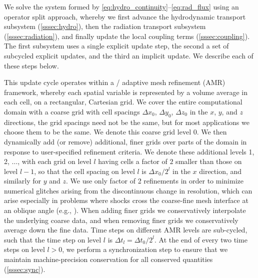 \documentclass[fleqn,usenatbib]{mnras}
\begin{document}
We solve the system formed by \autoref{eq:hydro_continuity}--\autoref{eq:rad_flux} using an operator split approach, whereby we first advance the hydrodynamic transport subsystem (\autoref{sssec:hydro}), then the radiation transport subsystem (\autoref{sssec:radiation}), and finally update the local coupling terms (\autoref{sssec:coupling}). The first subsystem uses a single explicit update step, the second a set of subcycled explicit updates, and the third an implicit update. We describe each of these steps below.

This update cycle operates within a \citet{Berger:1984} / \citet{Berger:1989} adaptive mesh refinement (AMR) framework, whereby each spatial variable is represented by a volume average in each cell, on a rectangular, Cartesian grid. We cover the entire computational domain with a coarse grid with cell spacings $\Delta x_0$, $\Delta y_0$, $\Delta z_0$ in the $x$, $y$, and $z$ directions, the grid spacings need not be the same, but for most applications we choose them to be the same. We denote this coarse grid level 0. We then dynamically add (or remove) additional, finer grids over parts of the domain in response to user-specified refinement criteria. We denote these additional levels 1, 2, $\ldots$, with each grid on level $l$ having cells a factor of $2$ smaller than those on level $l-1$, so that the cell spacing on level $l$ is $\Delta x_0/2^l$ in the $x$ direction, and similarly for $y$ and $z$. We use only factor of 2 refinements in order to minimize numerical glitches arising from the discontinuous change in resolution, which can arise especially in problems where shocks cross the coarse-fine mesh interface at an oblique angle (e.g., \citealt{Fryxell_2000}). When adding finer grids we conservatively interpolate the underlying coarse data, and when removing finer grids we conservatively average down the fine data. Time steps on different AMR levels are sub-cycled, such that the time step on level $l$ is $\Delta t_l = \Delta t_0/2^l$. At the end of every two time steps on level $l > 0$, we perform a synchronization step to ensure that we maintain machine-precision conservation for all conserved quantities (\autoref{sssec:sync}).
\end{document}
